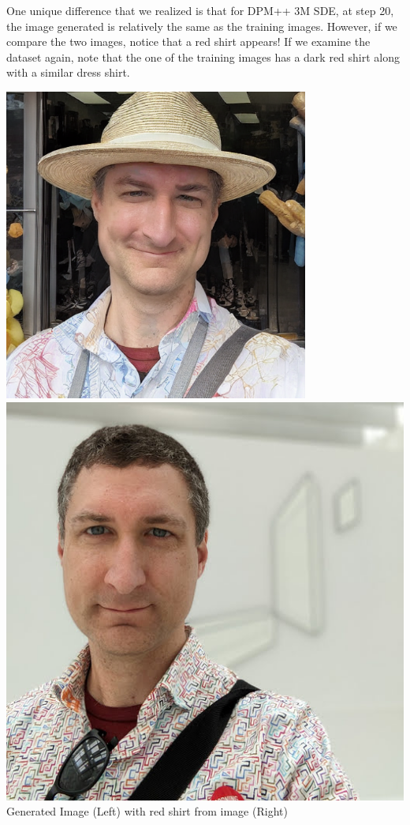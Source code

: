 \documentclass{article}
\begin{document}
\newpage
One unique difference that we realized is that for DPM++ 3M SDE, at step 20, the image generated is relatively the same as the training images. However, if we compare the two images, notice that a red shirt appears! If we examine the dataset again, note that the one of the training images has a dark red shirt along with a similar dress shirt.
\begin{center}
    \includegraphics[scale=0.35]{.imgs/radkeredshirt.PNG}
    \includegraphics[scale=0.2]{.imgs/dataset/00014-0-PXL_20230509_204242326.PORTRAIT.jpg}\\
    Generated Image (Left) with red shirt from image (Right)
\end{center}
\end{document}
